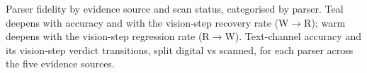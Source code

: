 \begin{table}[t]
\caption{Parser fidelity by evidence source and scan status, categorised by parser. Teal deepens with accuracy and with the vision-step recovery rate (W$\rightarrow$R); warm deepens with the vision-step regression rate (R$\rightarrow$W). Text-channel accuracy and its vision-step verdict transitions, split digital vs scanned, for each parser across the five evidence sources.}
\label{tab:parser_fidelity}
\end{table}